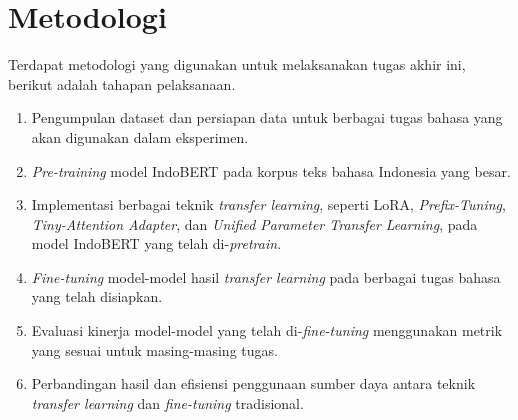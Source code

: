 \section{Metodologi}

Terdapat metodologi yang digunakan untuk melaksanakan tugas akhir ini, berikut adalah tahapan pelaksanaan.

\begin{enumerate}
    \item Pengumpulan dataset dan persiapan data untuk berbagai tugas bahasa yang akan digunakan dalam eksperimen.
    \item \textit{Pre-training} model IndoBERT pada korpus teks bahasa Indonesia yang besar.
    \item Implementasi berbagai teknik \textit{transfer learning}, seperti LoRA, \textit{Prefix-Tuning}, \textit{Tiny-Attention Adapter}, dan \textit{Unified Parameter Transfer Learning}, pada model IndoBERT yang telah di-\textit{pretrain}.
    \item \textit{Fine-tuning} model-model hasil \textit{transfer learning} pada berbagai tugas bahasa yang telah disiapkan.
    \item Evaluasi kinerja model-model yang telah di-\textit{fine-tuning} menggunakan metrik yang sesuai untuk masing-masing tugas.
    \item Perbandingan hasil dan efisiensi penggunaan sumber daya antara teknik \textit{transfer learning} dan \textit{fine-tuning} tradisional.
\end{enumerate}